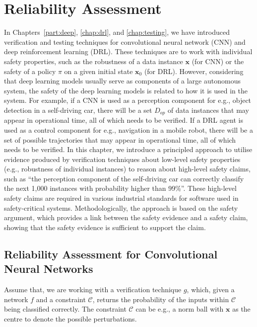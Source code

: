 \chapter{Reliability Assessment}\label{sec:safetyassurance}


In Chapters~\ref{part:deep}, \ref{chap:drl}, and  \ref{chap:testing}, we have introduced  verification and testing techniques for convolutional neural network (CNN) and deep reinforcement learning (DRL).  These techniques are to work with individual safety properties, such as the robustness of a data instance $\textbf{x}$ (for CNN) or the safety of a policy $\pi$ on a given initial state $\textbf{x}_0$ (for DRL). However, considering that deep learning models usually serve as components of a large autonomous system, the safety of the deep learning models is related to how it is used in the system. For example, if a CNN is used as a perception component for e.g., object detection in a self-driving car, there will be a set $D_{op}$ of data instances that may appear in operational time, all of which needs to be verified. If a DRL agent is used as a control component for e.g., navigation in a mobile robot, there will be a set of possible trajectories that may appear in operational time, all of which needs to be verified.  
%
In this chapter, we introduce a principled approach to utilise evidence produced by verification techniques about low-level safety properties (e.g., robustness of individual instances) to reason about high-level safety claims, such as ``the perception component of the self-driving car can correctly classify the next 1,000 instances with probability higher than 99\%''. These high-level safety claims are required in various industrial standards for software used in safety-critical systems. 
%
Methodologically, the approach is based on the safety argument, which provides a link between the safety evidence and a safety claim, showing that the safety evidence is sufficient to support the claim. 


\section{Reliability Assessment for Convolutional Neural Networks}\label{sec:assuranceCNN}

Assume that, we are working with a verification technique $g$, which, given a network $f$ and a constraint $\mathcal{C}$, returns the probability of the inputs within $\mathcal{C}$ being classified correctly. The constraint $\mathcal{C}$ can be e.g., a norm ball with $\textbf{x}$ as the centre to denote the possible perturbations. 



